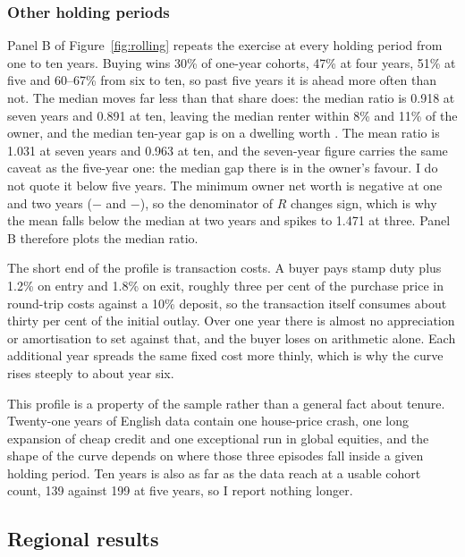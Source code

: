 \subsubsection*{Other holding periods}

Panel B of Figure~\ref{fig:rolling} repeats the exercise at every holding period from one to ten years. Buying wins 30\% of one-year cohorts, 47\% at four years, 51\% at five and 60--67\% from six to ten, so past five years it is ahead more often than not. The median moves far less than that share does: the median ratio is 0.918 at seven years and 0.891 at ten, leaving the median renter within 8\% and 11\% of the owner, and the median ten-year gap is  on a dwelling worth . The mean ratio is 1.031 at seven years and 0.963 at ten, and the seven-year figure carries the same caveat as the five-year one: the median gap there is  in the owner's favour. I do not quote it below five years. The minimum owner net worth is negative at one and two years ($-$ and $-$), so the denominator of $R$ changes sign, which is why the mean falls below the median at two years and spikes to 1.471 at three. Panel B therefore plots the median ratio.

The short end of the profile is transaction costs. A buyer pays stamp duty plus 1.2\% on entry and 1.8\% on exit, roughly three per cent of the purchase price in round-trip costs against a 10\% deposit, so the transaction itself consumes about thirty per cent of the initial outlay. Over one year there is almost no appreciation or amortisation to set against that, and the buyer loses on arithmetic alone. Each additional year spreads the same fixed cost more thinly, which is why the curve rises steeply to about year six.

This profile is a property of the sample rather than a general fact about tenure. Twenty-one years of English data contain one house-price crash, one long expansion of cheap credit and one exceptional run in global equities, and the shape of the curve depends on where those three episodes fall inside a given holding period. Ten years is also as far as the data reach at a usable cohort count, 139 against 199 at five years, so I report nothing longer.

\subsection{Regional results}
\label{sec:regional}

